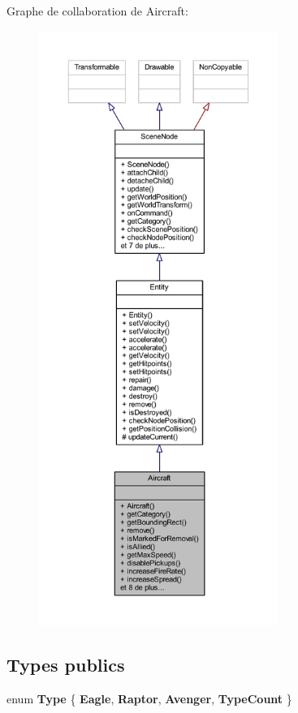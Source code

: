 Graphe de collaboration de Aircraft\+:\nopagebreak
\begin{figure}[H]
\begin{center}
\leavevmode
\includegraphics[height=550pt]{class_aircraft__coll__graph}
\end{center}
\end{figure}
\subsection*{Types publics}
\begin{DoxyCompactItemize}
\item 
\hypertarget{class_aircraft_a7dae28542933e088032b753600046acd}{}\label{class_aircraft_a7dae28542933e088032b753600046acd} 
enum {\bfseries Type} \{ {\bfseries Eagle}, 
{\bfseries Raptor}, 
{\bfseries Avenger}, 
{\bfseries Type\+Count}
 \}
\end{DoxyCompactItemize}
